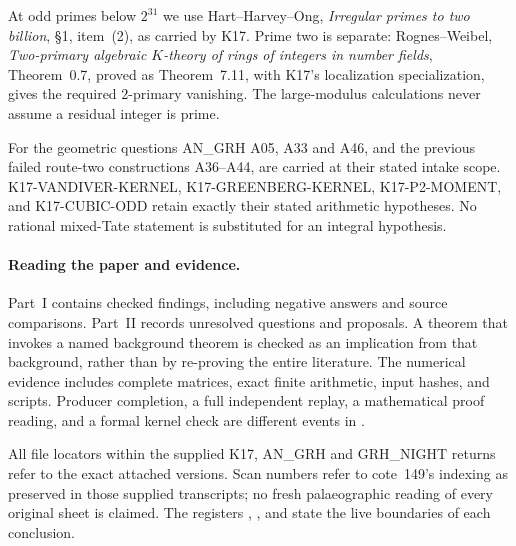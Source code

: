 At odd primes below $2^{31}$ we use Hart--Harvey--Ong,
\emph{Irregular primes to two billion}, \S1, item~(2), as carried
by K17. Prime two is separate: Rognes--Weibel,
\emph{Two-primary algebraic $K$-theory of rings of integers in
number fields}, Theorem~0.7, proved as Theorem~7.11,
with K17's localization specialization, gives the required
$2$-primary vanishing. The large-modulus calculations never
assume a residual integer is prime.

For the geometric questions AN\_GRH A05, A33 and A46, and the
previous failed route-two constructions A36--A44, are carried at
their stated intake scope. K17-VANDIVER-KERNEL,
K17-GREENBERG-KERNEL, K17-P2-MOMENT, and K17-CUBIC-ODD retain
exactly their stated arithmetic hypotheses. No rational
mixed-Tate statement is substituted for an integral hypothesis.

\paragraph{Reading the paper and evidence.}
Part~I contains checked findings, including negative answers and
source comparisons. Part~II records unresolved questions and
proposals. A theorem that invokes a named background theorem is
checked as an implication from that background, rather than by
re-proving the entire literature. The numerical evidence includes
complete matrices, exact finite arithmetic, input hashes, and
scripts. Producer completion, a full independent replay, a
mathematical proof reading, and a formal kernel check are different
events in .

All file locators within the supplied K17, AN\_GRH and GRH\_NIGHT
returns refer to the exact attached versions. Scan numbers refer
to cote~149's indexing as preserved in those supplied transcripts;
no fresh palaeographic reading of every original sheet is claimed.
The registers , , and
 state the live boundaries of each conclusion.
